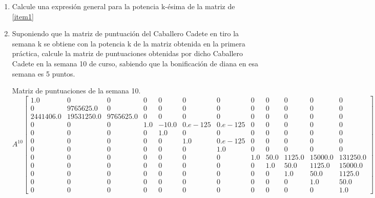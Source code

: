 \documentclass[10pt,a4paper]{article}
\begin{document}
\begin{enumerate}
	\item Calcule una expresión general para la potencia k-ésima de la matriz de \ref{item1}
	\item Suponiendo que la matriz de puntuación del Caballero Cadete en tiro la semana k se obtiene con la potencia k de la matriz obtenida en la primera práctica, calcule la matriz de puntuaciones obtenidas por dicho Caballero Cadete en la semana 10 de curso, sabiendo que la bonificación de diana en esa semana es 5 puntos.
	
	Matriz de puntuaciones de la semana  10.
	$$
	A^{10}\begin{bmatrix}
1.0	&	0	&	0	&	0	&	0	&	0	&	0	&	0	&	0	&	0	&	0	&	0\\
0	&	9765625.0	&	0	&	0	&	0	&	0	&	0	&	0	&	0	&	0	&	0	&	0\\
2441406.0	&	19531250.0	&	9765625.0	&	0	&	0	&	0	&	0	&	0	&	0	&	0	&	0	&	0\\
0	&	0	&	0	&	1.0	&	-10.0	&	0.e-125	&	 0.e-125	&	0	&	0	&	0	&	0	&	0\\
0	&	0	&	0	&	0	&	1.0	&	0	&	0	&	0	&	0	&	0	&	0	&	0\\
0	&	0	&	0	&	0	&	0	&	1.0	&	0.e-125	&	0	&	0	&	0	&	0	&	0\\
0	&	0	&	0	&	0	&	0	&	0	&	1.0	&	0	&	0	&	0	&	0	&	0\\
0	&	0	&	0	&	0	&	0	&	0	&	0	&	1.0	&	50.0	&	1125.0	&	15000.0	&	131250.0\\
0	&	0	&	0	&	0	&	0	&	0	&	0	&	0	&	1.0	&	50.0	&	1125.0	&	15000.0\\
0	&	0	&	0	&	0	&	0	&	0	&	0	&	0	&	0	&	1.0	&	50.0	&	1125.0\\
0	&	0	&	0	&	0	&	0	&	0	&	0	&	0	&	0	&	0	&	1.0	&	50.0\\
0	&	0	&	0	&	0	&	0	&	0	&	0	&	0	&	0	&	0	&	0	&	1.0
\end{bmatrix}	
	$$    
	

\end{enumerate}
\end{document}
